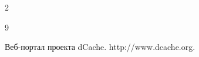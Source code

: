 \begin{multicols}{2}
{{\begin{thebibliography}{9}
\label{end\stat}







Веб-пор\-тал проекта dCache. {\sf http://www.dcache.org}.








\end{thebibliography}


} }





\end{multicols}


